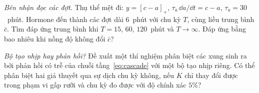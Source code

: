 \begin{exercise}[\lvlB]
\label{ex:16:6}
\emph{Bên nhận đọc các đợt.} Thụ thể mệt đi: $y=[c-a]_+$, $\tau_a\,\dd a/\dd t=c-a$, $\tau_a=30$~phút. Hormone đến thành các đợt dài $6$~phút với chu kỳ $T$, cùng liều trung bình $\bar c$. Tìm đáp ứng trung bình khi $T=15$, $60$, $120$~phút và $T\to\infty$. Đáp ứng bằng bao nhiêu khi nồng độ không đổi $\bar c$?
\end{exercise}

\begin{exercise}[\lvlC]
\label{ex:16:7}
\emph{Bộ tạo nhịp hay phản hồi?} Đề xuất một thí nghiệm phân biệt các xung sinh ra bởi phản hồi có trễ của chuỗi tầng~\eqref{eq:cascade} với một bộ tạo nhịp riêng. Có thể phân biệt hai giả thuyết qua sự dịch chu kỳ không, nếu $K$ chỉ thay đổi được trong phạm vi gấp rưỡi và chu kỳ đo được với độ chính xác $5\%$?
\end{exercise}
